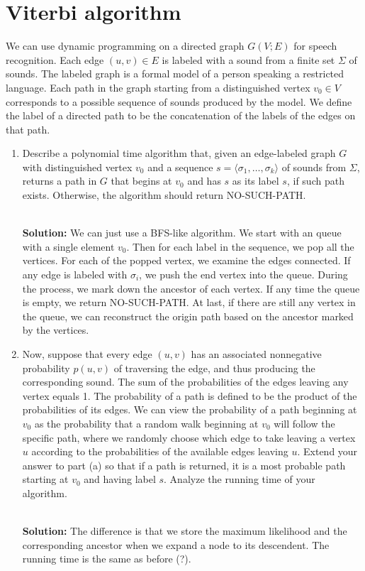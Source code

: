\section{Viterbi algorithm}
We can use dynamic programming on a directed graph $G(V;E)$ for speech recognition. Each edge $(u,v)\in E$ is labeled with a sound from a finite set $\Sigma$ of sounds. The labeled graph is a formal model of a person speaking a restricted language. Each path in the graph starting from a distinguished vertex $v_0\in V$ corresponds to a possible sequence of sounds produced by the model. We define the label of a directed path to be the concatenation of the labels of the edges on that path.

\begin{enumerate}
\item Describe a polynomial time algorithm that, given an edge-labeled graph $G$ with distinguished vertex $v_0$ and a sequence $s=\langle\sigma_1,\dots,\sigma_k\rangle$ of sounds from $\Sigma$, returns a path in $G$ that begins at $v_0$ and has $s$ as its label $s$, if such path exists. Otherwise, the algorithm should return NO-SUCH-PATH.

\ \\{\bf Solution:} We can just use a BFS-like algorithm. We start with an queue with a single element $v_0$. Then for each label in the sequence, we pop all the vertices. For each of the popped vertex, we examine the edges connected. If any edge is labeled with $\sigma_i$, we push the end vertex into the queue. During the process, we mark down the ancestor of each vertex. If any time the queue is empty, we return NO-SUCH-PATH. At last, if there are still any vertex in the queue, we can reconstruct the origin path based on the ancestor marked by the vertices.

\item Now, suppose that every edge $(u,v)$ has an associated nonnegative probability $p(u,v)$ of traversing the edge, and thus producing the corresponding sound. The sum of the probabilities of the edges leaving any vertex equals 1. The probability of a path is defined to be the product of the probabilities of its edges. We can view the probability of a path beginning at $v_0$ as the probability that a random walk beginning at $v_0$ will follow the specific path, where we randomly choose which edge to take leaving a vertex $u$ according to the probabilities of the available edges leaving $u$. Extend your answer to part (a) so that if a path is returned, it is a most probable path starting at $v_0$ and having label $s$. Analyze the running time of your algorithm.

\ \\{\bf Solution:} The difference is that we store the maximum likelihood and the corresponding ancestor when we expand a node to its descendent. The running time is the same as before (?).
\end{enumerate}